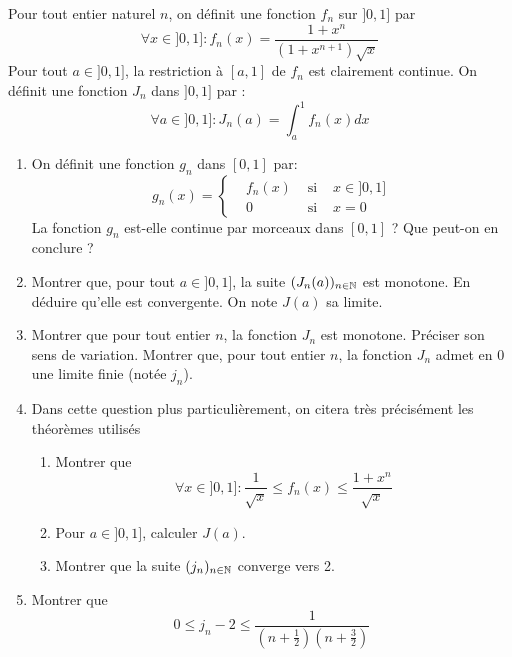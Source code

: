 Pour tout entier naturel $n$, on définit une fonction $f_{n}$ sur $]0,1]$ par
\begin{displaymath}
\forall x\in ]0,1] : f_{n}(x)=\frac{1+x^{n}}{(1+x^{n+1})\sqrt{x}}
\end{displaymath}
Pour tout $a\in ]0,1]$, la restriction à $[a,1]$ de $f_n$ est clairement continue. On définit une fonction $J_n$  dans $]0,1]$ par :
\begin{displaymath}
 \forall a \in ]0,1] : J_n(a) = \int_a^1 f_n(x)dx
\end{displaymath}

\begin{enumerate}
\item On définit une fonction $g_n$ dans $[0,1]$ par:
\begin{displaymath}
 g_n(x)=
\left\lbrace 
\begin{aligned}
 &f_n(x) &\text{ si } &x\in ]0,1] \\
 &0 &\text{ si } &x=0
\end{aligned}
\right. 
\end{displaymath}
La fonction $g_n$ est-elle continue par morceaux dans $[0,1]$ ? Que peut-on en conclure ?
\item Montrer que, pour tout $a\in ]0,1]$, la suite $(J_{n}(a))_{n\in\mathbb{N}}$ est monotone. En déduire qu'elle est convergente. On note $J(a)$ sa limite.
\item Montrer que pour tout entier $n$, la fonction $J_n$ est monotone. Préciser son sens de variation. Montrer que, pour tout entier $n$, la fonction $J_n$ admet en $0$ une limite finie (notée $j_n$).
\item Dans cette question plus particulièrement, on citera très précisément les théorèmes utilisés
\begin{enumerate}
\item Montrer que
\begin{displaymath}
 \forall x\in ]0,1] : \dfrac{1}{\sqrt{x}}\leq f_n(x) \leq \dfrac{1+x^n}{\sqrt{x}}
\end{displaymath}
\item Pour $a\in]0,1]$, calculer $J(a)$.
\item Montrer que la suite $(j_n)_{n\in \mathbb{N}}$ converge vers 2.
\end{enumerate}
\item Montrer que 
\begin{displaymath}
 0 \leq j_n -2 \leq \dfrac{1}{(n+\frac{1}{2})(n+\frac{3}{2})}
\end{displaymath}
\end{enumerate}


